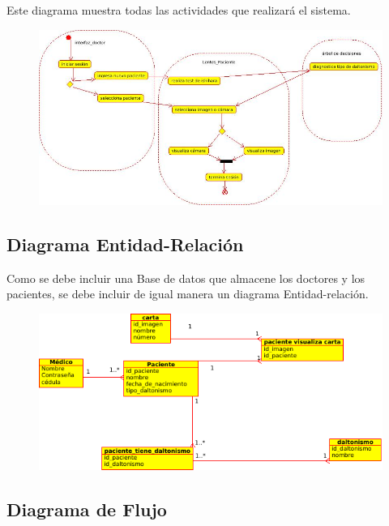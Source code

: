\documentclass[10pt]{article}
\begin{document}
Este diagrama muestra todas las actividades que realizará el sistema.

\begin{figure}[H]
	\begin{center}
\includegraphics[scale = 0.75]{UML/actividades.jpeg}
	\end{center} 
\end{figure}

\subsection{Diagrama Entidad-Relación}

Como se debe incluir una Base de datos que almacene los doctores y los pacientes, se debe incluir de igual manera un diagrama Entidad-relación.

\begin{figure}[H]
	\begin{center}
\includegraphics[scale = 1.0]{UML/er.png}
	\end{center} 
\end{figure}

\subsection{Diagrama de Flujo}
\end{document}
